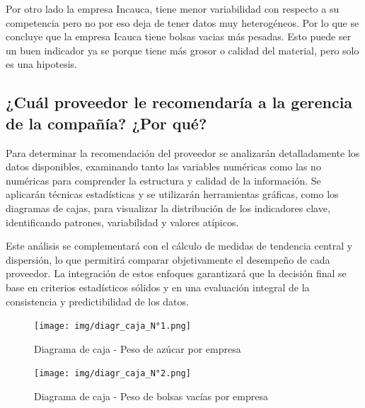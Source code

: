 \documentclass[12pt]{article}
\begin{document}
	Por otro lado la empresa Incauca, tiene menor variabilidad con respecto a su competencia pero no por eso deja de tener datos muy heterogéneos. 
    \vspace{0.5cm}
	Por lo que se concluye que la empresa Icauca tiene bolsas vacias más pesadas. Esto puede ser un buen indicador ya se porque tiene más grosor o calidad del material, pero solo es una hipotesis.

    \subsection{¿Cuál proveedor le recomendaría a la gerencia de la compañía? ¿Por qué?}

Para determinar la recomendación del proveedor se analizarán detalladamente los datos disponibles, examinando tanto las variables numéricas como las no numéricas para comprender la estructura y calidad de la información. Se aplicarán técnicas estadísticas y se utilizarán herramientas gráficas, como los diagramas de cajas, para visualizar la distribución de los indicadores clave, identificando patrones, variabilidad y valores atípicos.  

\vspace{0.5cm}
Este análisis se complementará con el cálculo de medidas de tendencia central y dispersión, lo que permitirá comparar objetivamente el desempeño de cada proveedor. La integración de estos enfoques garantizará que la decisión final se base en criterios estadísticos sólidos y en una evaluación integral de la consistencia y predictibilidad de los datos.

\begin{figure}[ht]
    \centering 
    \begin{minipage}{0.45\textwidth} 
        \centering
        \texttt{[image: img/diagr\_caja\_N°1.png]} 
        \caption{Diagrama de caja - Peso de azúcar por empresa} 
        \label{fig:boxplot_azucar}
    \end{minipage}
    \hfill 
    \begin{minipage}{0.45\textwidth} 
        \centering
        \texttt{[image: img/diagr\_caja\_N°2.png]}
        \caption{Diagrama de caja - Peso de bolsas vacías por empresa}
        \label{fig:boxplot_bolsas}
    \end{minipage}
\end{figure}

\newpage
\end{document}

